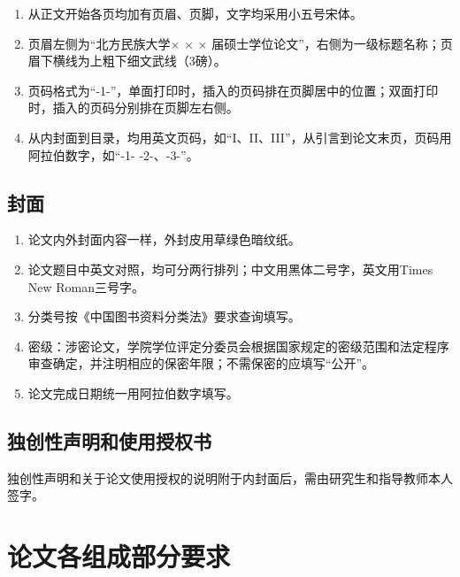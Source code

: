 \begin{enumerate}[label=\arabic*)]
	\item 从正文开始各页均加有页眉、页脚，文字均采用小五号宋体。
	
	\item 页眉左侧为“北方民族大学$\times$ $\times$ $\times$ 届硕士学位论文”，右侧为一级标题名称；页眉下横线为上粗下细文武线（3磅）。
	
	\item 页码格式为“-1-”，单面打印时，插入的页码排在页脚居中的位置；双面打印时，插入的页码分别排在页脚左右侧。
	
	\item 从内封面到目录，均用英文页码，如“I、II、III”，从引言到论文末页，页码用阿拉伯数字，如“-1- -2-、-3-”。
\end{enumerate}

\subsection{封面}

\begin{enumerate}[label=\arabic*)]
	\item 论文内外封面内容一样，外封皮用草绿色暗纹纸。
	
	\item 论文题目中英文对照，均可分两行排列；中文用黑体二号字，英文用Times New Roman三号字。
	
	\item 分类号按《中国图书资料分类法》要求查询填写。
	
	\item 密级：涉密论文，学院学位评定分委员会根据国家规定的密级范围和法定程序审查确定，并注明相应的保密年限；不需保密的应填写“公开”。
	
	\item 论文完成日期统一用阿拉伯数字填写。
\end{enumerate}

\subsection{独创性声明和使用授权书}

独创性声明和关于论文使用授权的说明附于内封面后，需由研究生和指导教师本人签字。

\section{论文各组成部分要求}

